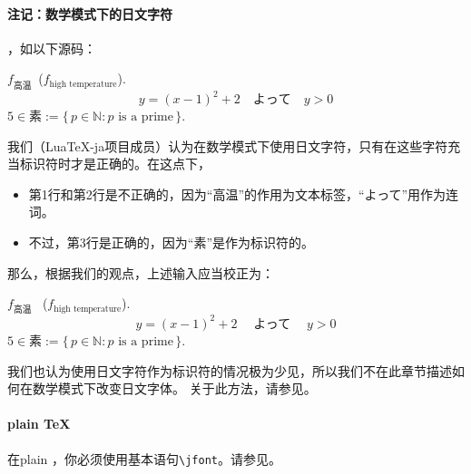 \documentclass{ltjarticle}
\DeclareRobustCommand\LuaTeX{Lua\TeX}
\DeclareRobustCommand\pTeX{p\kern-.05em\TeX}
\begin{document}
\paragraph{注记：数学模式下的日文字符} ，如以下源码：
\begin{LTXexample}
$f_{高温}$~($f_{\text{high temperature}}$).
\[ y=(x-1)^2+2\quad よって\quad y>0 \]
$5\in 素:=\{\,p\in\mathbb N:\text{$p$ is a prime}\,\}$.
\end{LTXexample}

我们（\LuaTeX-ja项目成员）认为在数学模式下使用日文字符，只有在这些字符充当标识符时才是正确的。在这点下，
\begin{itemize}
\item 第1行和第2行是不正确的，因为“高温”的作用为文本标签，“よって”用作为连词。
\item 不过，第3行是正确的，因为“素”是作为标识符的。
\end{itemize}

那么，根据我们的观点，上述输入应当校正为：
\begin{LTXexample}
$f_{\text{高温}}$~%
($f_{\text{high temperature}}$).
\[ y=(x-1)^2+2\quad
  \mathrel{\text{よって}}\quad y>0 \]
$5\in 素:=\{\,p\in\mathbb N:\text{$p$ is a prime}\,\}$.
\end{LTXexample}

我们也认为使用日文字符作为标识符的情况极为少见，所以我们不在此章节描述如何在数学模式下改变日文字体。
关于此方法，请参见。
\paragraph{plain \TeX} 在plain ，你必须使用基本语句\verb!\jfont!。请参见。
\end{document}
